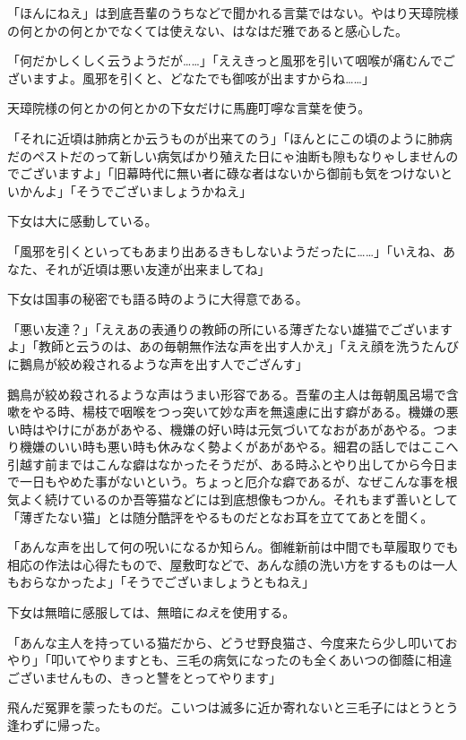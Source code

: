 \documentclass[12pt, openright]{book}
\begin{document}
「ほんにねえ」は到底吾輩のうちなどで聞かれる言葉ではない。やはり天璋院様の何とかの何とかでなくては使えない、はなはだ雅であると感心した。

「何だかしくしく云うようだが\ldots{}\ldots{}」「ええきっと風邪を引いて咽喉が痛むんでございますよ。風邪を引くと、どなたでも御咳が出ますからね\ldots{}\ldots{}」

天璋院様の何とかの何とかの下女だけに馬鹿叮嚀な言葉を使う。

「それに近頃は肺病とか云うものが出来てのう」「ほんとにこの頃のように肺病だのペストだのって新しい病気ばかり殖えた日にゃ油断も隙もなりゃしませんのでございますよ」「旧幕時代に無い者に碌な者はないから御前も気をつけないといかんよ」「そうでございましょうかねえ」

下女は大に感動している。

「風邪を引くといってもあまり出あるきもしないようだったに\ldots{}\ldots{}」「いえね、あなた、それが近頃は悪い友達が出来ましてね」

下女は国事の秘密でも語る時のように大得意である。

「悪い友達？」「ええあの表通りの教師の所にいる薄ぎたない雄猫でございますよ」「教師と云うのは、あの毎朝無作法な声を出す人かえ」「ええ顔を洗うたんびに鵝鳥が絞め殺されるような声を出す人でござんす」

鵝鳥が絞め殺されるような声はうまい形容である。吾輩の主人は毎朝風呂場で含嗽をやる時、楊枝で咽喉をつっ突いて妙な声を無遠慮に出す癖がある。機嫌の悪い時はやけにがあがあやる、機嫌の好い時は元気づいてなおがあがあやる。つまり機嫌のいい時も悪い時も休みなく勢よくがあがあやる。細君の話しではここへ引越す前まではこんな癖はなかったそうだが、ある時ふとやり出してから今日まで一日もやめた事がないという。ちょっと厄介な癖であるが、なぜこんな事を根気よく続けているのか吾等猫などには到底想像もつかん。それもまず善いとして「薄ぎたない猫」とは随分酷評をやるものだとなお耳を立ててあとを聞く。

「あんな声を出して何の呪いになるか知らん。御維新前は中間でも草履取りでも相応の作法は心得たもので、屋敷町などで、あんな顔の洗い方をするものは一人もおらなかったよ」「そうでございましょうともねえ」

下女は無暗に感服しては、無暗に\emph{ねえ}を使用する。

「あんな主人を持っている猫だから、どうせ野良猫さ、今度来たら少し叩いておやり」「叩いてやりますとも、三毛の病気になったのも全くあいつの御蔭に相違ございませんもの、きっと讐をとってやります」

飛んだ冤罪を蒙ったものだ。こいつは滅多に近か寄れないと三毛子にはとうとう逢わずに帰った。
\end{document}
